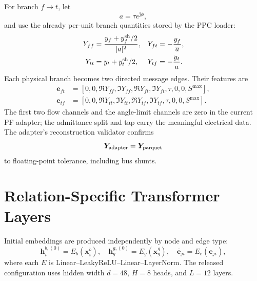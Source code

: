 \documentclass[10pt]{article}
\begin{document}
For branch \(f\to t\), let
\begin{equation}
 a=\tau e^{\mathrm j\phi},
\end{equation}
and use the already per-unit branch quantities stored by the PPC loader:
\begin{align}
 Y_{ff}&=\frac{y_f+y_f^{\rm sh}/2}{|a|^2}, &
 Y_{ft}&=-\frac{y_f}{\overline a},\\
 Y_{tt}&=y_t+y_t^{\rm sh}/2, &
 Y_{tf}&=-\frac{y_t}{a}.
\end{align}
Each physical branch becomes two directed message edges. Their features are
\begin{align}
 \bm e_{ft}&=[0,0,\Re Y_{ff},\Im Y_{ff},\Re Y_{ft},\Im Y_{ft},\tau,0,0,S^{\max}],\\
 \bm e_{tf}&=[0,0,\Re Y_{tt},\Im Y_{tt},\Re Y_{tf},\Im Y_{tf},\tau,0,0,S^{\max}].
\end{align}
The first two flow channels and the angle-limit channels are zero in the current
PF adapter; the admittance split and tap carry the meaningful electrical data.
The adapter's reconstruction validator confirms
\begin{equation}
 \bm Y_{\rm adapter}=\bm Y_{\rm parquet}
\end{equation}
to floating-point tolerance, including bus shunts.

\section{Relation-Specific Transformer Layers}

Initial embeddings are produced independently by node and edge type:
\begin{equation}
 \bm h_i^{b,(0)}=E_b(\bm x_i^b),\quad
 \bm h_g^{g,(0)}=E_g(\bm x_g^g),\quad
 \bar{\bm e}_{ji}=E_e(\bm e_{ji}),
\end{equation}
where each \(E\) is Linear--LeakyReLU--Linear--LayerNorm. The released
configuration uses hidden width \(d=48\), \(H=8\) heads, and \(L=12\) layers.
\end{document}
